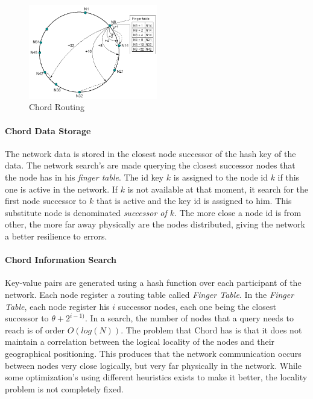 \label{sec:chord}
\begin{figure}
\center
\includegraphics[width=0.5\textwidth]{img/chord-search}
\caption{Chord Routing}
\label{fig:p2p_estructured_chord_search}
\end{figure}

\paragraph{Chord Data Storage}
The network data is stored in the closest node successor of the hash key of the
data. The network search's are made querying the closest successor
nodes that the node has in his \textit{finger table}.
The id key $k$ is assigned to the node id $k$ if this one is active in the
network. If $k$ is not available at that moment, it search for the first node
successor to $k$ that is active and the key id is assigned to him. This
substitute node is denominated \textit{successor of $k$}.
The more close a node id is from other, the more far away physically are the
nodes distributed, giving the network a better resilience to errors.

\paragraph{Chord Information Search}
Key-value pairs are generated using a hash function over each participant of
the network.  Each node register a routing table called \textit{Finger Table}.
In the \textit{Finger Table}, each node register his $i$ successor nodes, each
one being the closest successor to $\theta + 2^{i-1)}$. 
In a search, the number of nodes that a query needs to reach is of order
$O(log(N))$.
The problem that Chord has is that it does not maintain a correlation
between the logical locality of the nodes and their geographical positioning. This
produces that the network communication occurs between nodes very close
logically, but very far physically in the network. While some
optimization's using different heuristics exists to make it better, the locality
problem is not completely fixed.

